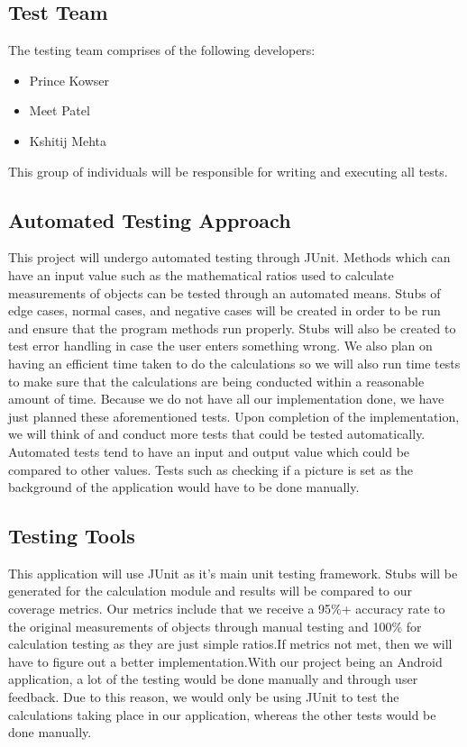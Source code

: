\documentclass[12pt, titlepage]{article}
\begin{document}
\subsection{Test Team}
The testing team comprises of the following developers:
\begin{itemize}
    \item Prince Kowser
    \item Meet Patel
    \item Kshitij Mehta
\end{itemize}

This group of individuals will be responsible for writing and executing all tests.

\subsection{Automated Testing Approach}

This project will undergo automated testing through {\color{red}JUnit}. Methods which can have an input value such as the mathematical ratios used to calculate measurements of objects can be tested through an automated means. Stubs of edge cases, normal cases, and negative cases will be created in order to be run and ensure that the program methods run properly. Stubs will also be created to test error handling in case the user enters something wrong. We also plan on having an efficient time taken to do the calculations so we will also run time tests to make sure that the calculations are being conducted within a reasonable amount of time. Because we do not have all our implementation done, we have just planned these aforementioned tests. Upon completion of the implementation, we will think of and conduct more tests that could be tested automatically. Automated tests tend to have an input and output value which could be compared to other values. Tests such as checking if a picture is set as the background of the application would have to be done manually.

\subsection{Testing Tools}
This application will use {\color{red}JUnit} as it's main unit testing framework. {\color{red}Stubs will be generated for the calculation module and  results will be compared to our coverage metrics. Our metrics include that we receive a 95\%+ accuracy rate to the original measurements of objects through manual testing and 100\% for calculation testing as they are just simple ratios.If metrics not met, then we will have to figure out a better implementation.With our project being an Android application, a lot of the testing would be done manually and through user feedback. Due to this reason, we would only be using JUnit to test the calculations taking place in our application, whereas the other tests would be done manually.} 
\end{document}
